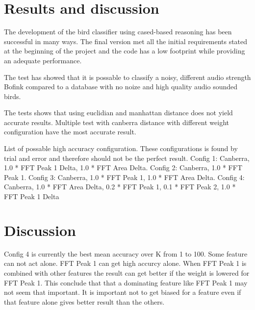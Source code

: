 \section{Results and discussion}
The development of the bird classifier using cased-based reasoning has
been successful in many ways. The final version met all the initial requirements
stated at the beginning of the project and the code has a low footprint while
providing an adequate performance.

The test has showed that it is possable to classify a noisy, different audio strength Bofink compared to a database with no noize and high quality audio sounded birds.

The tests shows that using euclidian and manhattan distance does not yield accurate results.
Multiple test with canberra distance with different weight configuration have the most accurate result.

List of possable high accuracy configuration.
These configurations is found by trial and error and therefore should not be the perfect result.
Config 1: Canberra, 1.0 * FFT Peak 1 Delta, 1.0 * FFT Area Delta.
Config 2: Canberra, 1.0 * FFT Peak 1.
Config 3: Canberra, 1.0 * FFT Peak 1, 1.0 * FFT Area Delta.
Config 4: Canberra, 1.0 * FFT Area Delta, 0.2 * FFT Peak 1, 0.1 * FFT Peak 2, 1.0 * FFT Peak 1 Delta

\section{Discussion}
Config 4 is currently the best mean accuracy over K from 1 to 100.
Some feature can not act alone. FFT Peak 1 can get high accurcy alone. When FFT Peak 1 is combined with other features the result can get better if the weight is lowered for FFT Peak 1. This conclude that that a dominating feature like FFT Peak 1 may not seem that important. It is important not to get biased for a feature even if that feature alone gives better result than the others.
